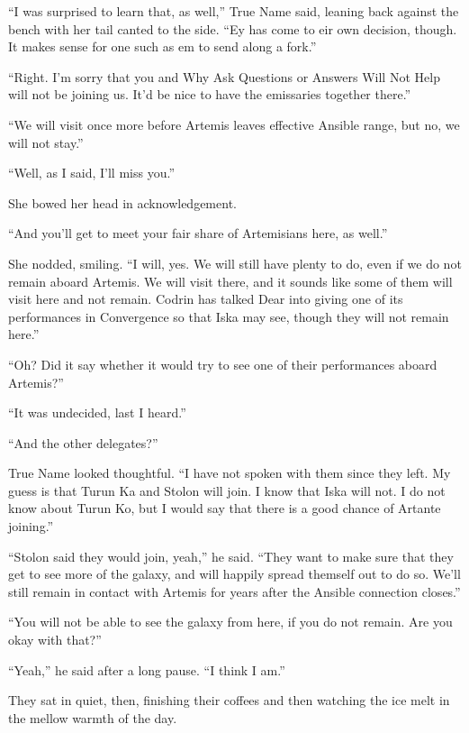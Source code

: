 ``I was surprised to learn that, as well,'' True Name said, leaning back against the bench with her tail canted to the side. ``Ey has come to eir own decision, though. It makes sense for one such as em to send along a fork.''

``Right. I'm sorry that you and Why Ask Questions or Answers Will Not Help will not be joining us. It'd be nice to have the emissaries together there.''

``We will visit once more before Artemis leaves effective Ansible range, but no, we will not stay.''

``Well, as I said, I'll miss you.''

She bowed her head in acknowledgement.

``And you'll get to meet your fair share of Artemisians here, as well.''

She nodded, smiling. ``I will, yes. We will still have plenty to do, even if we do not remain aboard Artemis. We will visit there, and it sounds like some of them will visit here and not remain. Codrin has talked Dear into giving one of its performances in Convergence so that Iska may see, though they will not remain here.''

``Oh? Did it say whether it would try to see one of their performances aboard Artemis?''

``It was undecided, last I heard.''

``And the other delegates?''

True Name looked thoughtful. ``I have not spoken with them since they left. My guess is that Turun Ka and Stolon will join. I know that Iska will not. I do not know about Turun Ko, but I would say that there is a good chance of Artante joining.''

``Stolon said they would join, yeah,'' he said. ``They want to make sure that they get to see more of the galaxy, and will happily spread themself out to do so. We'll still remain in contact with Artemis for years after the Ansible connection closes.''

``You will not be able to see the galaxy from here, if you do not remain. Are you okay with that?''

``Yeah,'' he said after a long pause. ``I think I am.''

They sat in quiet, then, finishing their coffees and then watching the ice melt in the mellow warmth of the day.
